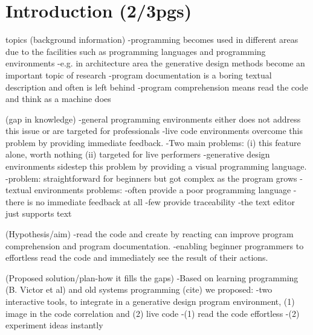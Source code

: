 
% 
% 

\section{Introduction (2/3pgs)}

topics (background information)
	-programming becomes used in different areas due to the facilities such as programming languages and programming environments
	-e.g. in architecture area the generative design methods become an important topic of research
	-program documentation is a boring textual description and often is left behind
	-program comprehension means read the code and think as a machine does

	(gap in knowledge)
	-general programming environments either does not address this issue or are targeted for professionals
	-live code environments overcome this problem by providing immediate feedback.
		-Two main problems: (i) this feature alone, worth nothing (ii) targeted for live performers
	-generative design environments sidestep this problem by providing a visual programming language.
		-problem: straightforward for beginners but got complex as the program grows
		-textual environments problems:
			-often provide a poor programming language
			-there is no immediate feedback at all
			-few provide traceability
			-the text editor just supports text

	(Hypothesis/aim)
	-read the code and create by reacting can improve program comprehension and program documentation.
		-enabling beginner programmers to effortless read the code and immediately see the result of their actions.

	(Proposed solution/plan-how it fills the gaps)
	-Based on learning programming (B. Victor et al) and old systems programming (cite) we proposed:
	-two interactive tools, to integrate in a generative design program environment, (1) image in the code correlation and (2) live code
		-(1) read the code effortless
		-(2) experiment ideas instantly 